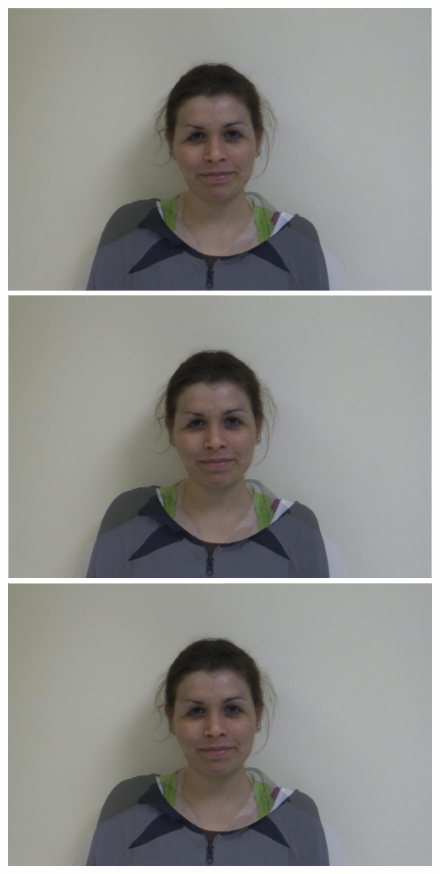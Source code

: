 \documentclass[11pt]{article}
\begin{document}
\begin{figure}[H]
\begin{center}
\includegraphics[scale=0.06]{figs/frames/morph_steinkirch_tangatur_19.jpg} 
\includegraphics[scale=0.06]{figs/frames/morph_steinkirch_tangatur_20.jpg} 
\includegraphics[scale=0.06]{figs/frames/morph_steinkirch_tangatur_21.jpg} 

\end{center}
\end{figure}
\end{document}
